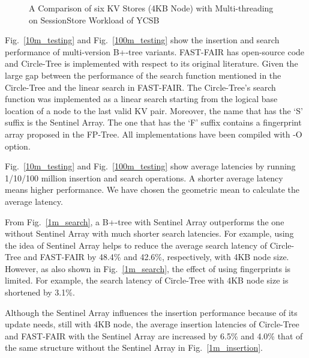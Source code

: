 \begin{figure*}[t]
\centering
{}%
%
%
\centering
\caption{A Comparison of six KV Stores (4KB Node) with Multi-threading on SessionStore Workload of YCSB}
\end{figure*}





Fig.~\ref{10m_testing} and Fig.~\ref{100m_testing} show the insertion and search performance of multi-version B+-tree variants. FAST-FAIR has open-source code and Circle-Tree is implemented with respect to its original literature. Given the large gap between the performance of the search function mentioned in the Circle-Tree and the linear search in FAST-FAIR. The Circle-Tree's search function was implemented as a linear search starting from the logical base location of a node to the last valid KV pair. Moreover, the name that has the `S' suffix is the Sentinel Array. The one that has the `F' suffix contains a fingerprint array proposed in the FP-Tree. All implementations have been compiled with -O option. 



Fig.~\ref{10m_testing} and Fig.~\ref{100m_testing} show average latencies by running 1/10/100 million insertion and search operations.  A shorter average latency means higher performance. We have chosen the geometric mean to calculate the average latency. 

From Fig.~\ref{1m_search}, a B+-tree with Sentinel Array outperforms the one without Sentinel Array with much shorter search latencies. For example, using the idea of Sentinel Array helps to reduce the average search latency of Circle-Tree and FAST-FAIR by 48.4\% and 42.6\%, respectively, with 4KB node size. However, as also shown in Fig.~\ref{1m_search}, the effect of using fingerprints is limited. For example, the search latency of Circle-Tree with 4KB node size is shortened by 3.1\%. 

Although the Sentinel Array influences the insertion performance because of its update needs, still with 4KB node, the average insertion latencies of Circle-Tree and FAST-FAIR with the Sentinel Array are increased by 6.5\% and 4.0\% that of the same structure without the Sentinel Array in Fig.~\ref{1m_insertion}. 

